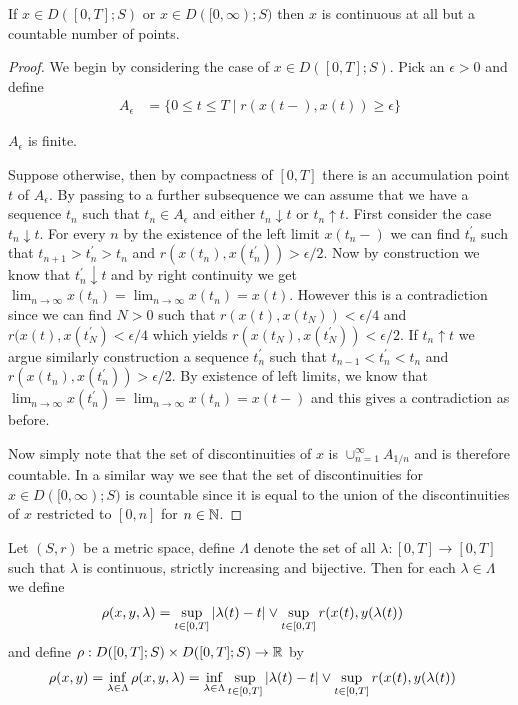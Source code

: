 \begin{lem}\label{CadlagCountableDiscontinuitySet}If $x \in D([0,T];
  S)$ or $x \in D([0,\infty); S)$ then $x$ is continuous at all but a
  countable number of points.
\end{lem}
\begin{proof}
We begin by considering the case of $x \in D([0,T]; S)$.  Pick an
$\epsilon > 0$ and define
\begin{align*}
A_\epsilon &= \lbrace 0 \leq t \leq T \mid r(x(t-), x(t)) \geq
\epsilon \rbrace
\end{align*}

\begin{clm} $A_\epsilon$ is finite.
\end{clm}

Suppose otherwise, then by compactness of $[0,T]$ there is an
accumulation point $t$ of $A_\epsilon$.  By passing to a further
subsequence we can assume that we have a sequence $t_n$ such that $t_n
\in A_\epsilon$ and
either $t_n \downarrow t$ or $t_n \uparrow t$.  First consider the
case $t_n \downarrow t$.  For every $n$ by the existence of the left
limit $x(t_n-)$ we can find $t_n^\prime$ such that $t_{n+1} >
t_n^\prime > t_n$ and $r(x(t_n), x(t_n^\prime)) > \epsilon/2$.  Now by
construction we
know that $t_n^\prime \downarrow t$ and by right continuity we get
$\lim_{n \to \infty} x(t_n) = \lim_{n \to \infty} x(t_n) = x(t)$.  
However this is a contradiction since we can find $N > 0$ such that
$r(x(t), x(t_N)) < \epsilon/4$ and $r(x(t), x(t_N^\prime) <
\epsilon/4$ which yields $r(x(t_N), x(t_N^\prime)) < \epsilon/2$.  If
$t_n \uparrow t$ we argue similarly construction a sequence
$t_n^\prime$ such that $t_{n-1} < t_n^\prime < t_n$ and $r(x(t_n),
x(t_n^\prime)) > \epsilon/2$.  By existence of left limits, we know that $\lim_{n \to \infty}
x(t_n^\prime) = \lim_{n \to \infty} x(t_n) = x(t-)$ and this gives a
contradiction as before.

Now simply note that the set of
discontinuities of $x$ is $\cup_{n=1}^\infty A_{1/n}$ and is therefore
countable.  In a similar way we see that the set of discontinuities
for $x \in D([0,\infty); S)$ is countable since it is equal to the
union of the discontinuities of $x$ restricted to $[0,n]$ for $n \in \mathbb{N}$.
\end{proof}

\begin{defn}Let $(S,r)$ be a metric space, define $\Lambda$ denote the set of all $\lambda : [0,T] \to
  [0,T]$ such that $\lambda$ is continuous, strictly increasing and
  bijective.  Then for each $\lambda \in \Lambda$ we define 
\begin{align*}
\rho(x,y,\lambda) &= \sup_{t \in [0,T]}\left \vert \lambda(t) - t \right \vert \vee \sup_{t \in [0,T]} r(x(t), y(\lambda(t))
\end{align*}
and define $\rho : D([0,T]; S) \times D([0,T]; S) \to  \mathbb{R}$ by 
\begin{align*}
\rho(x,y) &= \inf_{\lambda \in \Lambda} \rho(x,y,\lambda)
= \inf_{\lambda \in \Lambda} 
\sup_{t \in [0,T]}\left \vert \lambda(t) - t \right \vert \vee \sup_{t \in [0,T]} r(x(t), y(\lambda(t))
\end{align*}
\end{defn}

